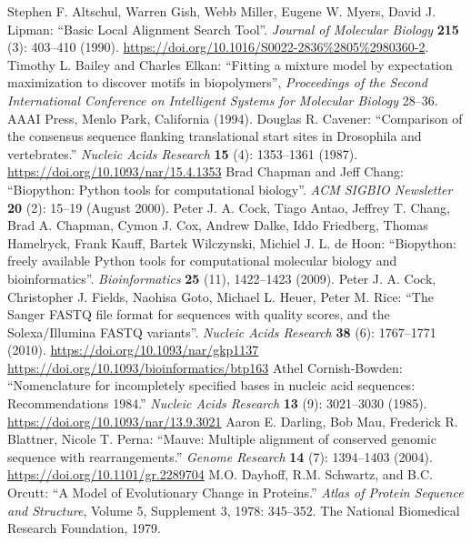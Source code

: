 \documentclass{report}
\begin{document}
\begin{thebibliography}{99}
Stephen F. Altschul, Warren Gish, Webb Miller, Eugene W. Myers, David J. Lipman: ``Basic Local Alignment Search Tool''. \textit{Journal of Molecular Biology} {\bf 215} (3): 403--410 (1990). \url{https://doi.org/10.1016/S0022-2836%2805%2980360-2}.
Timothy L. Bailey and Charles Elkan: ``Fitting a mixture model by expectation maximization to discover motifs in biopolymers'', \textit{Proceedings of the Second International Conference on Intelligent Systems for Molecular Biology} 28--36. AAAI Press, Menlo Park, California (1994).
Douglas R. Cavener: ``Comparison of the consensus sequence flanking translational start sites in Drosophila and vertebrates.'' \textit{Nucleic Acids Research} {\bf 15} (4): 1353--1361 (1987). \url{https://doi.org/10.1093/nar/15.4.1353}
Brad Chapman and Jeff Chang: ``Biopython: Python tools for computational biology''. \textit{ACM SIGBIO Newsletter} {\bf 20} (2): 15--19 (August 2000).
Peter J. A. Cock, Tiago Antao, Jeffrey T. Chang, Brad A. Chapman, Cymon J. Cox, Andrew Dalke, Iddo Friedberg, Thomas Hamelryck, Frank Kauff, Bartek Wilczynski, Michiel J. L. de Hoon: ``Biopython: freely available Python tools for computational molecular biology and bioinformatics''. {\it Bioinformatics} {\bf 25} (11), 1422--1423 (2009).
Peter J. A. Cock, Christopher J. Fields, Naohisa Goto, Michael L. Heuer, Peter M. Rice: ``The Sanger FASTQ file format for sequences with quality scores, and the Solexa/Illumina FASTQ variants''. \textit{Nucleic Acids Research} {\bf 38} (6): 1767--1771 (2010). \url{https://doi.org/10.1093/nar/gkp1137} \url{https://doi.org/10.1093/bioinformatics/btp163}
Athel Cornish-Bowden: ``Nomenclature for incompletely specified bases in nucleic acid sequences: Recommendations 1984.'' \textit{Nucleic Acids Research} {\bf 13} (9): 3021--3030 (1985). \url{https://doi.org/10.1093/nar/13.9.3021}
Aaron E. Darling, Bob Mau, Frederick R. Blattner, Nicole T. Perna: ``Mauve: Multiple alignment of conserved genomic sequence with rearrangements.'' \textit{Genome Research} {\bf 14} (7): 1394--1403 (2004). \url{https://doi.org/10.1101/gr.2289704}
M.O. Dayhoff, R.M. Schwartz, and B.C. Orcutt: ``A Model of Evolutionary Change in Proteins.'' \textit{Atlas of Protein Sequence and Structure}, Volume 5, Supplement 3, 1978: 345--352. The National Biomedical Research Foundation, 1979.

\end{thebibliography}
\end{document}
